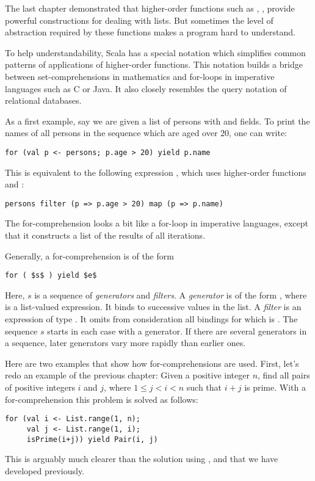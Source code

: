 The last chapter demonstrated that higher-order functions such as
\verb@map@, \verb@flatMap@, \verb@filter@ provide powerful
constructions for dealing with lists.  But sometimes the level of
abstraction required by these functions makes a program hard to
understand.

To help understandability, Scala has a special notation which
simplifies common patterns of applications of higher-order functions.
This notation builds a bridge between set-comprehensions in
mathematics and for-loops in imperative languages such as C or
Java. It also closely resembles the query notation of relational
databases.

As a first example, say we are given a list  of persons
with  and  fields.  To print the names of all
persons in the sequence which are aged over 20, one can write:
\begin{lstlisting}
for (val p <- persons; p.age > 20) yield p.name
\end{lstlisting}
This is equivalent to the following expression , which uses
higher-order functions  and :
\begin{lstlisting}
persons filter (p => p.age > 20) map (p => p.name)
\end{lstlisting}
The for-comprehension looks a bit like a for-loop in imperative languages,
except that it constructs a list of the results of all iterations.

Generally, a for-comprehension is of the form
\begin{lstlisting}
for ( $s$ ) yield $e$
\end{lstlisting}
Here, $s$ is a sequence of {\em generators} and {\em filters}.  A {\em
generator} is of the form , where  is a
list-valued expression. It binds  to successive values in the
list.  A {\em filter} is an expression  of type
.  It omits from consideration all bindings for which
 is .  The sequence $s$ starts in each case with a
generator.  If there are several generators in a sequence, later
generators vary more rapidly than earlier ones.

Here are two examples that show how for-comprehensions are used.
First, let's redo an example of the previous chapter: Given a positive
integer $n$, find all pairs of positive integers $i$ and $j$, where $1
\leq j < i < n$ such that $i + j$ is prime. With a for-comprehension
this problem is solved as follows:
\begin{lstlisting}
for (val i <- List.range(1, n);
     val j <- List.range(1, i);
     isPrime(i+j)) yield Pair(i, j)
\end{lstlisting}
This is arguably much clearer than the solution using ,
 and  that we have developed previously.


